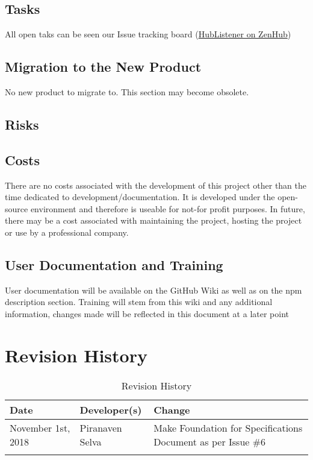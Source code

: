 \documentclass{article}
\begin{document}
\subsection{Tasks}
All open taks can be seen our Issue tracking board (\href{ https://app.zenhub.com/workspaces/hublistener-5bad6c4d4b5806bc2bea488f/boards?repos=150634456}{HubListener on ZenHub})
\subsection{Migration to the New Product}

No new product to migrate to. This section may become obsolete. 

\subsection{Risks}
\subsection{Costs}

There are no costs associated with the development of this project other than the time dedicated to development/documentation. It is developed under the open-source environment and therefore is useable for not-for profit purposes. In future, there may be a cost associated with maintaining the project, hosting the project or use by a professional company. 

\subsection{User Documentation and Training}

User documentation will be available on the GitHub Wiki as well as on the npm description section. 
\newline
Training will stem from this wiki and any additional information, changes made will be reflected in this document at a later point


\newpage
\section{Revision History}
\begin{table}[hp]
\caption{Revision History} \label{TblRevisionHistory}
\begin{tabularx}{\textwidth}{llX}
\toprule
\textbf{Date} & \textbf{Developer(s)} & \textbf{Change}\\
\midrule
November 1st, 2018 & Piranaven Selva & Make Foundation for Specifications Document as per Issue \#6 \\
\\
\bottomrule
\end{tabularx}
\end{table}
\end{document}

